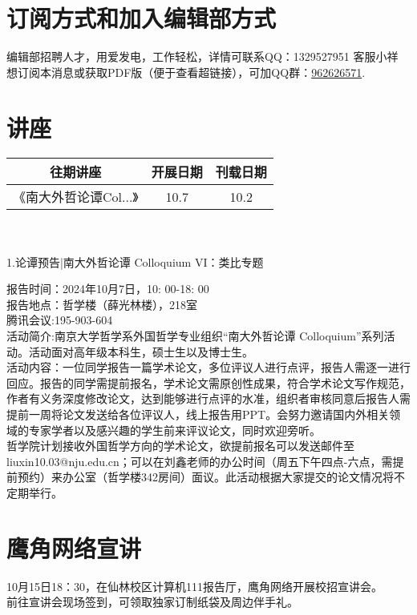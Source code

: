 \documentclass[letterpaper, 12pt]{article}
\begin{document}
\begin{multicols}{2}
\section{订阅方式和加入编辑部方式}
编辑部招聘人才，用爱发电，工作轻松，详情可联系QQ：1329527951 客服小祥\\想订阅本消息或获取PDF版（便于查看超链接），可加QQ群：\href{https://qm.qq.com/q/FGX1VYCrGS}{962626571}.
\section{讲座}
\begin{tabular}{|c|c|c|}
    \hline
    往期讲座 & 开展日期 & 刊载日期\\
    \hline\hline
    《南大外哲论谭Col...》 & 10.7 & 10.2\\
      \hline
\end{tabular}\\\\
1.论谭预告|南大外哲论谭 Colloquium VI：类比专题

报告时间：2024年10月7日，10: 00-18: 00
\\报告地点：哲学楼（薛光林楼），218室
\\腾讯会议:195-903-604
\\活动简介:南京大学哲学系外国哲学专业组织“南大外哲论谭 Colloquium”系列活动。活动面对高年级本科生，硕士生以及博士生。\\
活动内容：一位同学报告一篇学术论文，多位评议人进行点评，报告人需逐一进行回应。报告的同学需提前报名，学术论文需原创性成果，符合学术论文写作规范，作者有义务深度修改论文，达到能够进行点评的水准，组织者审核同意后报告人需提前一周将论文发送给各位评议人，线上报告用PPT。会努力邀请国内外相关领域的专家学者以及感兴趣的学生前来评议论文，同时欢迎旁听。\\
哲学院计划接收外国哲学方向的学术论文，欲提前报名可以发送邮件至liuxin10.03@nju.edu.cn；可以在刘鑫老师的办公时间（周五下午四点-六点，需提前预约）来办公室（哲学楼342房间）面议。此活动根据大家提交的论文情况将不定期举行。
\section{鹰角网络宣讲}
10月15日18：30，在仙林校区计算机111报告厅，鹰角网络开展校招宣讲会。\\
前往宣讲会现场签到，可领取独家订制纸袋及周边伴手礼。

\end{multicols}
\end{document}
